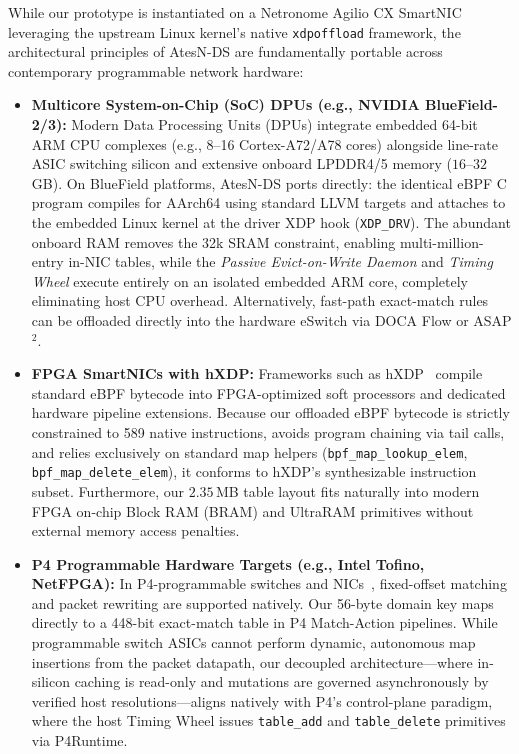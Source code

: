 \documentclass[a4paper,fleqn,colorlinks,hidelinks]{cas-sc}
\begin{document}
While our prototype is instantiated on a Netronome Agilio CX SmartNIC leveraging the upstream Linux kernel's native \texttt{xdpoffload} framework, the architectural principles of AtesN-DS are fundamentally portable across contemporary programmable network hardware:
\begin{itemize}
    \item \textbf{Multicore System-on-Chip (SoC) DPUs (e.g., NVIDIA BlueField-2/3):} Modern Data Processing Units (DPUs) integrate embedded 64-bit ARM CPU complexes (e.g., 8--16 Cortex-A72/A78 cores) alongside line-rate ASIC switching silicon and extensive onboard LPDDR4/5 memory ($16$--$32$\,GB). On BlueField platforms, AtesN-DS ports directly: the identical eBPF C program compiles for AArch64 using standard LLVM targets and attaches to the embedded Linux kernel at the driver XDP hook (\texttt{XDP\_DRV}). The abundant onboard RAM removes the 32k SRAM constraint, enabling multi-million-entry in-NIC tables, while the \textit{Passive Evict-on-Write Daemon} and \textit{Timing Wheel} execute entirely on an isolated embedded ARM core, completely eliminating host CPU overhead. Alternatively, fast-path exact-match rules can be offloaded directly into the hardware eSwitch via DOCA Flow or ASAP$^2$.
    \item \textbf{FPGA SmartNICs with hXDP:} Frameworks such as hXDP~\citep{performance:hxdp} compile standard eBPF bytecode into FPGA-optimized soft processors and dedicated hardware pipeline extensions. Because our offloaded eBPF bytecode is strictly constrained to 589 native instructions, avoids program chaining via tail calls, and relies exclusively on standard map helpers (\texttt{bpf\_map\_lookup\_elem}, \texttt{bpf\_map\_delete\_elem}), it conforms to hXDP's synthesizable instruction subset. Furthermore, our $2.35$\,MB table layout fits naturally into modern FPGA on-chip Block RAM (BRAM) and UltraRAM primitives without external memory access penalties.
    \item \textbf{P4 Programmable Hardware Targets (e.g., Intel Tofino, NetFPGA):} In P4-programmable switches and NICs~\citep{10619855,woodruff2019p4dns}, fixed-offset matching and packet rewriting are supported natively. Our 56-byte domain key maps directly to a 448-bit exact-match table in P4 Match-Action pipelines. While programmable switch ASICs cannot perform dynamic, autonomous map insertions from the packet datapath, our decoupled architecture—where in-silicon caching is read-only and mutations are governed asynchronously by verified host resolutions—aligns natively with P4's control-plane paradigm, where the host Timing Wheel issues \texttt{table\_add} and \texttt{table\_delete} primitives via P4Runtime.
\end{itemize}
\end{document}
